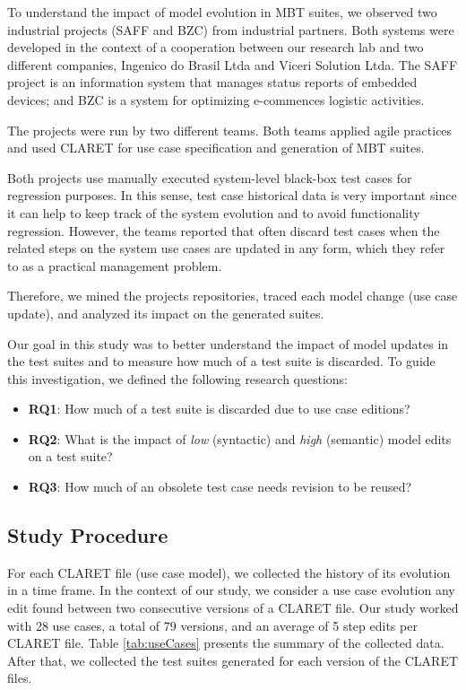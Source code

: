 
To understand the impact of model evolution in MBT suites, we observed two industrial projects (SAFF and BZC) from industrial partners. Both systems were developed in the context of a cooperation between our research lab and two different companies, Ingenico do Brasil Ltda and Viceri Solution Ltda. The SAFF project is an information system that manages status reports of embedded devices; and BZC is a system for optimizing e-commences logistic activities.  

The projects were run by two different teams. Both teams applied agile practices and used CLARET for use case specification and generation of MBT suites. 

Both projects use manually executed system-level black-box test cases for regression purposes. In this sense, test case historical data is very important since it can help to keep track of the system evolution and to avoid functionality regression. However, the teams reported that often discard test cases when the related steps on the system use cases are updated in any form, which they refer to as a practical management problem.

Therefore, we mined the projects repositories, traced each model change (use case update), and analyzed its impact on the generated suites.

Our goal in this study was to better understand the impact of model updates in the test suites and to measure how much of a test suite is discarded. To guide this investigation, we defined the following research questions:

\begin{itemize}
    \item \textbf{RQ1}: How much of a test suite is discarded due to use case editions?
    \item \textbf{RQ2}: What is the impact of \textit{low}  (syntactic) and \textit{high} (semantic) model edits on a test suite?
    \item \textbf{RQ3}: How much of an obsolete test case needs revision to be reused?
\end{itemize}

\subsection{Study Procedure} 
For each CLARET file (use case model), we collected the history of its evolution in a time frame. In the context of our study, we consider a use case evolution any edit found between two consecutive versions of a CLARET file. Our study worked with 28 use cases, a total of 79 versions, and an average of 5 step edits per CLARET file. Table \ref{tab:useCases} presents the summary of the collected data. After that, we collected the test suites generated for each version of the CLARET files. 

